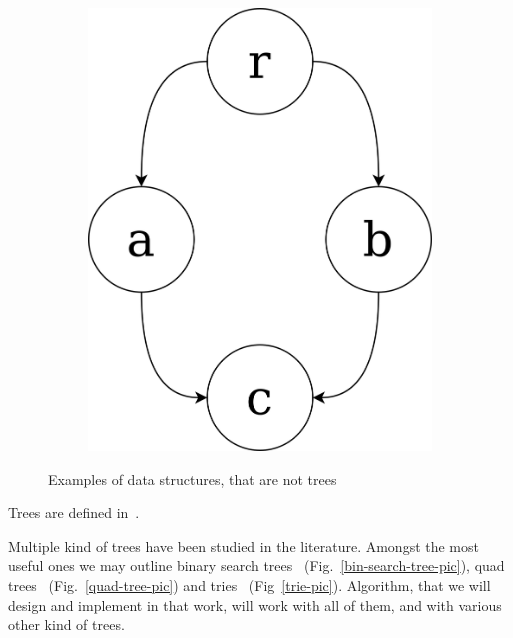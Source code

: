 \documentclass[times, dvipsnames,%
               languages={russian,english} %
              ]{itmo-student-thesis}
\begin{document}
\begin{figure}[H]
\begin{subfigure}[b]{0.25\linewidth}
          \label{non-HDS-2-pic}
     \end{subfigure}
     \hfill
     \begin{subfigure}[b]{0.25\linewidth}
          \centering
          \includegraphics[width=\linewidth]{non-HDS-3.png}
          \label{non-HDS-3-pic}
     \end{subfigure}
    \caption{Examples of data structures, that are not trees}
    \label{non-HDS}
\end{figure}

Trees are defined in~\cite{tree-definition}.

Multiple kind of trees have been studied in the literature. Amongst the most useful ones we may outline binary search trees~\cite{cormen2022introduction} (Fig.~\ref{bin-search-tree-pic}), quad trees~\cite{de2000computational} (Fig.~\ref{quad-tree-pic}) and tries~\cite{bodon2003trie} (Fig~\ref{trie-pic}). Algorithm, that we will design and implement in that work, will work with all of them, and with various other kind of trees.
\end{document}
